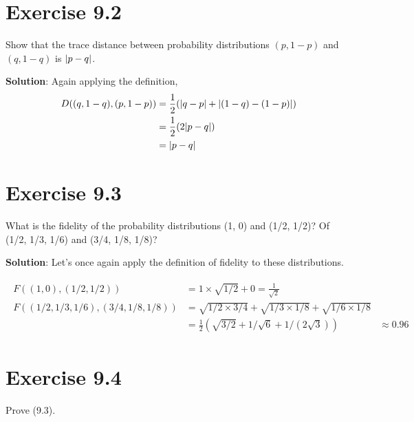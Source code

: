 \documentclass{book}
\begin{document}
\section*{Exercise 9.2}
    Show that the trace distance between probability distributions $(p, 1 - p)$ and $(q, 1 - q)$ is $\abs{p - q}$.
    
    \textbf{Solution}: Again applying the definition,
    \begin{align}
    \begin{aligned}
        D((q,1-q), (p,1-p)) &= \frac{1}{2}(\abs{q-p} + \abs{(1-q)-(1-p)}) \\
        &= \frac{1}{2} (2 \abs{p-q}) \\
        &= \abs{p-q}
    \end{aligned}
    \end{align}

\section*{Exercise 9.3}
    What is the fidelity of the probability distributions (1, 0) and (1/2, 1/2)? Of (1/2, 1/3, 1/6) and (3/4, 1/8, 1/8)?
    
    \textbf{Solution}: Let's once again apply the definition of fidelity to these distributions.
    
    \begin{align}
    \begin{aligned}
        F((1,0),(1/2,1/2)) &= 1\times \sqrt{1/2} + 0 = \frac{1}{\sqrt{2}} \\
        F((1/2,1/3,1/6),(3/4,1/8,1/8)) &= \sqrt{1/2\times 3/4} + \sqrt{1/3\times 1/8}+\sqrt{1/6\times 1/8} \\
        &= \frac{1}{2}(\sqrt{3/2} + 1/\sqrt{6}+1/(2\sqrt{3}))
        &\approx 0.96
    \end{aligned}
    \end{align}

\section*{Exercise 9.4}
    Prove (9.3).
    
\end{document}
